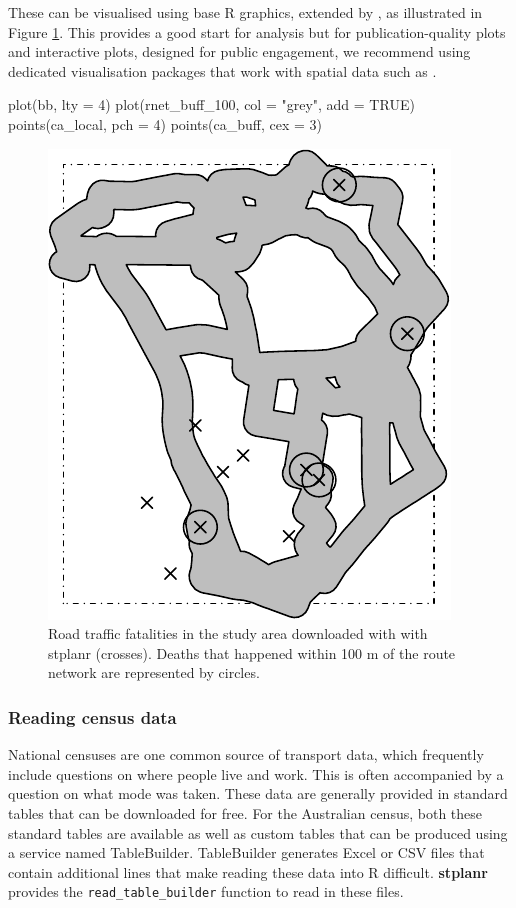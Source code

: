 These can be visualised using base R graphics, extended by ,
as illustrated in Figure \ref{fig:fats}. This provides a good start for
analysis but for publication-quality plots and interactive plots,
designed for public engagement, we recommend using dedicated
visualisation packages that work with spatial data such as
.

\begin{Schunk}
\begin{Sinput}
plot(bb, lty = 4)
plot(rnet_buff_100, col = "grey", add = TRUE)
points(ca_local, pch = 4)
points(ca_buff, cex = 3)
\end{Sinput}
\begin{figure}

{\centering \includegraphics[width=0.5\linewidth]{fats-1}

}

\caption[Road traffic fatalities in the study area downloaded with with stplanr (crosses)]{Road traffic fatalities in the study area downloaded with with stplanr (crosses). Deaths that happened within 100 m of the route network are represented by circles.}\label{fig:fats}
\end{figure}
\end{Schunk}

\subsubsection{Reading census data} \label{reading-census-data}

National censuses are one common source of transport data, which frequently include questions on where people live and work.
This is often accompanied by a question on what mode was taken.
These data are generally provided in standard tables that can be downloaded for free.
For the Australian census, both these standard tables are available as well as custom tables that can be produced using a service named TableBuilder.
TableBuilder generates Excel or CSV files that contain additional lines that make reading these data into R difficult.
\textbf{stplanr} provides the \texttt{read\_table\_builder} function to read in these files.

